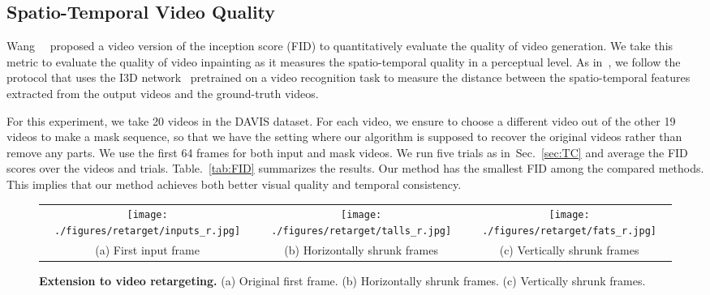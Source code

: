\documentclass[10pt,twocolumn,letterpaper]{article}
\newcommand{\tabref}[1]{Table.~\ref{#1}}
\newcommand{\secref}[1]{Sec.~\ref{#1}}
\begin{document}
\subsection{Spatio-Temporal Video Quality}

Wang~\etal~\cite{wang2018video} proposed a video version of the inception score (FID) to quantitatively evaluate the quality of video generation. We take this metric to evaluate the quality of video inpainting as it measures the spatio-temporal quality in a perceptual level. As in~\cite{wang2018video}, we follow the protocol that uses the I3D network~\cite{carreira2017quo} pretrained on a video recognition task to measure the distance between the spatio-temporal features extracted from the output videos and the ground-truth videos. 


For this experiment, we take 20 videos in the DAVIS dataset. For each video, we ensure to choose a different video out of the other 19 videos to make a mask sequence, so that we have the setting where our algorithm is supposed to recover the original videos rather than remove any parts. We use the first 64 frames for both input and mask videos. 
We run five trials as in~\secref{sec:TC} and average the FID scores over the videos and trials.
\tabref{tab:FID} summarizes the results. Our method has the smallest FID among the compared methods. This implies that our method achieves both better visual quality and temporal consistency.









\begin{figure*}[t]
\begin{center}
\def\arraystretch{1.0}
\begin{tabular}{@{}c@{\hskip 0.008\linewidth}c@{\hskip 0.008\linewidth}c@{}}
    \texttt{[image: ./figures/retarget/inputs\_r.jpg]}&
    \texttt{[image: ./figures/retarget/talls\_r.jpg]}&
    \texttt{[image: ./figures/retarget/fats\_r.jpg]}\\
{(a) First input frame} & {(b) Horizontally shrunk frames} & {(c) Vertically shrunk frames} \\
\end{tabular}
\end{center}
\caption{\textbf{Extension to video retargeting.} (a) Original first frame. (b) Horizontally shrunk frames. (c) Vertically shrunk frames.}
\label{fig:retarget}
\end{figure*}
\end{document}
